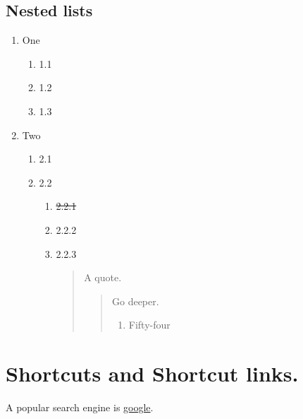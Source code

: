 \subsection{\label{ordered-nested-lists}Nested lists}
\begin{enumerate}
\item 
\par One
\begin{enumerate}
\item 
\par 1.1 
\item 
\par 1.2 
\item 
\par 1.3
\end{enumerate}

\par 
\item 
\par Two
\begin{enumerate}
\item 
\par 2.1 
\item 
\par 2.2
\begin{enumerate}
\item 
\par \st{2.2.1} 
\item 
\par 2.2.2 
\item 
\par 2.2.3
\begin{quote}
\par A quote.
\begin{quote}
\par Go deeper.
\begin{enumerate}
\item 
\par Fifty-four
\end{enumerate}

\end{quote}

\end{quote}

\end{enumerate}

\end{enumerate}

\end{enumerate}

\section{\label{shortcuts-and-shortcut-links}Shortcuts and Shortcut links.}
\par A popular search engine is \href{https://www.google.com}{google}.
